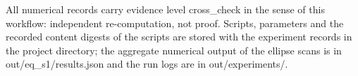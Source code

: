 \documentclass[11pt]{article}
\theoremstyle{definition}
\theoremstyle{remark}
\begin{document}
All numerical records carry evidence level cross\_check in the sense of this workflow: independent
re-computation, not proof. Scripts, parameters and the recorded content digests of the scripts are stored with the
experiment records in the project directory; the aggregate numerical output of the ellipse scans is in
out/eq\_s1/results.json and the run logs are in out/experiments/.
\end{document}
